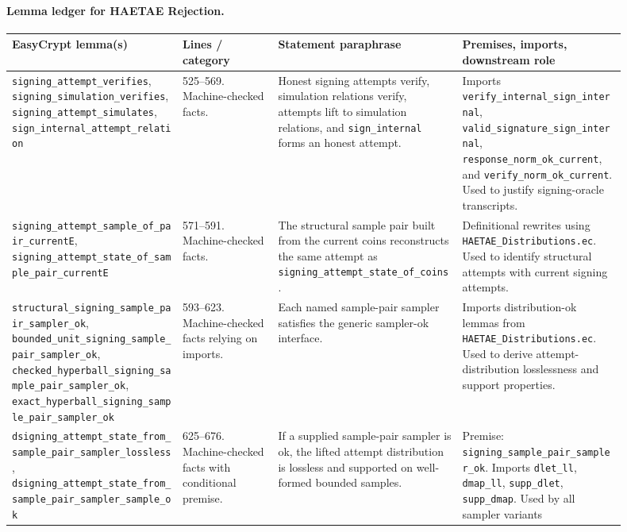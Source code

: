 \documentclass[11pt]{report}
\DeclareRobustCommand{\file}[1]{\ifmmode\text{\nolinkurl{#1}}\else\nolinkurl{#1}\fi}
\DeclareRobustCommand{\ec}[1]{\ifmmode\text{\nolinkurl{#1}}\else\nolinkurl{#1}\fi}
\theoremstyle{definition}
\theoremstyle{plain}
\begin{document}
\paragraph{Lemma ledger for HAETAE Rejection.}
{\footnotesize
\begin{longtable}{p{0.25\linewidth}p{0.14\linewidth}p{0.27\linewidth}p{0.24\linewidth}}
\toprule
\textbf{EasyCrypt lemma(s)} & \textbf{Lines / category} &
\textbf{Statement paraphrase} & \textbf{Premises, imports, downstream role} \\
\midrule
\ec{signing\_attempt\_verifies},
\ec{signing\_simulation\_verifies},
\ec{signing\_attempt\_simulates},
\ec{sign\_internal\_attempt\_relation} &
525--569. Machine-checked facts. &
Honest signing attempts verify, simulation relations verify, attempts lift to
simulation relations, and \ec{sign\_internal} forms an honest attempt. &
Imports \ec{verify\_internal\_sign\_internal},
\ec{valid\_signature\_sign\_internal}, \ec{response\_norm\_ok\_current}, and
\ec{verify\_norm\_ok\_current}.  Used to justify signing-oracle transcripts. \\
\midrule
\ec{signing\_attempt\_sample\_of\_pair\_currentE},
\ec{signing\_attempt\_state\_of\_sample\_pair\_currentE} &
571--591. Machine-checked facts. &
The structural sample pair built from the current coins reconstructs the same
attempt as \ec{signing\_attempt\_state\_of\_coins}. &
Definitional rewrites using \file{HAETAE\_Distributions.ec}.  Used to identify
structural attempts with current signing attempts. \\
\midrule
\ec{structural\_signing\_sample\_pair\_sampler\_ok},
\ec{bounded\_unit\_signing\_sample\_pair\_sampler\_ok},
\ec{checked\_hyperball\_signing\_sample\_pair\_sampler\_ok},
\ec{exact\_hyperball\_signing\_sample\_pair\_sampler\_ok} &
593--623. Machine-checked facts relying on imports. &
Each named sample-pair sampler satisfies the generic sampler-ok interface. &
Imports distribution-ok lemmas from \file{HAETAE\_Distributions.ec}.  Used to
derive attempt-distribution losslessness and support properties. \\
\midrule
\ec{dsigning\_attempt\_state\_from\_sample\_pair\_sampler\_lossless},
\ec{dsigning\_attempt\_state\_from\_sample\_pair\_sampler\_sample\_ok} &
625--676. Machine-checked facts with conditional premise. &
If a supplied sample-pair sampler is ok, the lifted attempt distribution is
lossless and supported on well-formed bounded samples. &
Premise: \ec{signing\_sample\_pair\_sampler\_ok}.  Imports \ec{dlet\_ll},
\ec{dmap\_ll}, \ec{supp\_dlet}, \ec{supp\_dmap}.  Used by all sampler variants

\end{longtable}}
\end{document}
